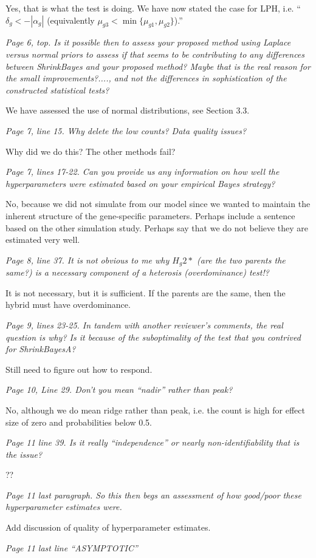 \documentclass{article}
\newcommand{\comment}[1]{\textit{#1}}
\newcommand{\response}[1]{#1}
\newcommand{\todo}[1]{{\color{red} #1}}
\begin{document}
\response{Yes, that is what the test is doing. We have now stated the case for LPH, i.e. ``$\delta_g < -|\alpha_g|$ (equivalently $\mu_{g3} < \min\{\mu_{g1},\mu_{g2}\}$).''

\comment{Page 6, top.  Is it possible then to assess your proposed method using Laplace versus normal priors to assess if that seems to be contributing to any differences between ShrinkBayes and your proposed method?  Maybe that is the real reason for the small improvements?...., and not the differences in sophistication of the constructed statistical tests?}

\response{We have assessed the use of normal distributions, see Section 3.3.}

\comment{Page 7, line 15.  Why delete the low counts?  Data quality issues?}

\todo{Why did we do this? The other methods fail?}

\comment{Page 7, lines 17-22.  Can you provide us any information on how well the hyperparameters were estimated based on your empirical Bayes strategy?}

\todo{No, because we did not simulate from our model since we wanted to maintain the inherent structure of the gene-specific parameters. Perhaps include a sentence based on the other simulation study. Perhaps say that we do not believe they are estimated very well.}

\comment{Page 8, line 37.  It is not obvious to me why $H_g2*$ (are the two parents the same?) is a necessary component of a heterosis (overdominance) test!?}

\response{It is not necessary, but it is sufficient. If the parents are the same, then the hybrid must have overdominance.}

\comment{Page 9, lines 23-25.  In tandem with another reviewer’s comments, the real question is why?  Is it because of the suboptimality of the test that you contrived for ShrinkBayesA?}

\todo{Still need to figure out how to respond.}

\comment{Page 10, Line 29.  Don’t you mean “nadir” rather than peak?}

\response{No, although we do mean ridge rather than peak, i.e. the count is high for effect size of zero and probabilities below 0.5.}

\comment{Page 11 line 39.  Is it really “independence” or nearly non-identifiability that is the issue?}

\todo{??}

\comment{Page 11 last paragraph.  So this then begs an assessment of how good/poor these hyperparameter estimates were.}

\todo{Add discussion of quality of hyperparameter estimates.}

\comment{Page 11 last line “ASYMPTOTIC”}}
\end{document}

